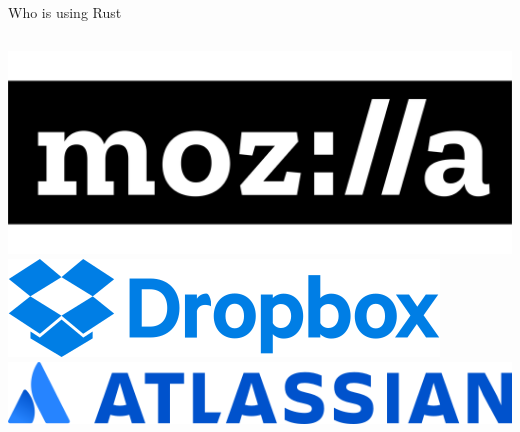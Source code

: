 \documentclass[12pt, aspectratio=169]{beamer}
\begin{document}
\begin{frame}{Who is using Rust}
  \begin{columns}
    \includegraphics[width=\textwidth]{images/mozilla.png}
    \includegraphics[width=\textwidth]{images/dropbox.png}
    \includegraphics[width=\textwidth]{images/atlassian.png}
  \end{columns}


\end{frame}
\end{document}
